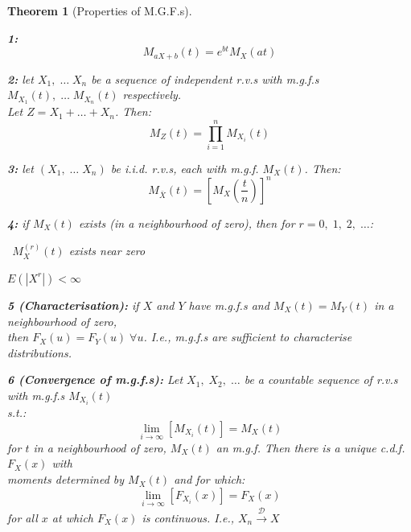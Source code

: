 \documentclass[12pt,a4paper]{article}
\newtheorem{thm}{Theorem}[subsection]
\begin{document}
\begin{thm}[Properties of M.G.F.s]\label{mgf properties}$\;$\par\vspace{1cm}

{\bf 1: }
$$M_{aX+b}(t) = e^{bt}M_X(at)$$\par\vspace{1cm}

{\bf 2: } let $X_1,\;\hdots\;X_n$ be a sequence of independent r.v.s with m.g.f.s $M_{X_1}(t),\;\hdots\;M_{X_n}(t)$ respectively.\\ \indent\indent Let $Z= X_1 + \hdots + X_n$. Then:
$$M_Z(t) = \prod_{i=1}^n M_{X_i}(t)$$\par\vspace{1cm}

{\bf 3: } let $(X_1,\;\hdots\;X_n)$ be i.i.d. r.v.s, each with m.g.f. $M_X(t)$. Then:
$$M_{\bar{X}}(t) = \left[M_X\left(\frac{t}{n}\right)\right]^n$$\par\vspace{1cm}

{\bf 4: } if $M_X(t)$ exists (in a neighbourhood of zero), then for $r=0,\;1,\;2,\;\hdots$:\par
\indent{}  $\;\,M_X^{(r)}(t)$ exists near zero\par
\indent{}  $E\left(\left|X^r\right|\right) < \infty$\par

{\bf 5 (Characterisation): } if $X$ and $Y$ have m.g.f.s and $M_X(t) = M_Y(t)$ in a neighbourhood of zero,\\ \indent\indent then $F_X(u) = F_Y(u)\;\forall u$. I.e., m.g.f.s are sufficient to characterise distributions.\par\vspace{1cm}

{\bf 6 (Convergence of m.g.f.s): } Let $X_1,\;X_2,\;\hdots$ be a countable sequence of r.v.s with m.g.f.s $M_{X_i}(t)$\\ \indent\indent s.t.:
$$\lim_{i\to\infty}\left[M_{X_i}(t)\right] = M_X(t)$$
\indent\indent for $t$ in a neighbourhood of zero, $M_X(t)$ an m.g.f. Then there is a unique c.d.f. $F_X(x)$ with\\ \indent\indent moments determined by $M_X(t)$ and for which:
$$\lim_{i\to\infty}\left[F_{X_i}(x)\right] = F_X(x)$$
\indent\indent for all $x$ at which $F_X(x)$ is continuous. I.e., $X_n\xrightarrow{\mathscr{D}}X$

\end{thm}
\end{document}
